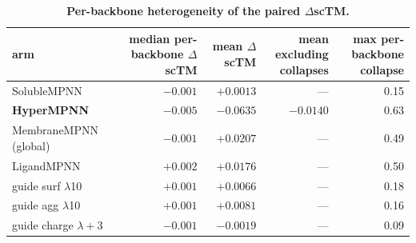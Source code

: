 \begin{table}[H]
  \centering
  \footnotesize
  \setlength{\tabcolsep}{2pt}
  \caption{\textbf{Per-backbone heterogeneity of the paired $\Delta$scTM.}}
  \label{tab:heterogeneity}
  \begin{tabular}{@{}lrrrr@{}}
    \toprule
    arm & \shortstack[r]{median per-backbone\\$\Delta$scTM} & \shortstack[r]{mean\\$\Delta$scTM} & \shortstack[r]{mean excluding\\collapses} & \shortstack[r]{max per-backbone\\collapse} \\
    \midrule
    SolubleMPNN & $-0.001$ & $+0.0013$ & --- & 0.15 \\
    \textbf{HyperMPNN} & $\bm{-0.005}$ & $\bm{-0.0635}$ & $\bm{-0.0140}$ & $\bm{0.63}$ \\
    MembraneMPNN (global) & $-0.001$ & $+0.0207$ & --- & 0.49 \\
    LigandMPNN & $+0.002$ & $+0.0176$ & --- & 0.50 \\
    guide surf $\lambda$10 & $+0.001$ & $+0.0066$ & --- & 0.18 \\
    guide agg $\lambda$10 & $+0.001$ & $+0.0081$ & --- & 0.16 \\
    guide charge $\lambda{+}3$ & $-0.001$ & $-0.0019$ & --- & 0.09 \\
    \bottomrule
  \end{tabular}
\end{table}

